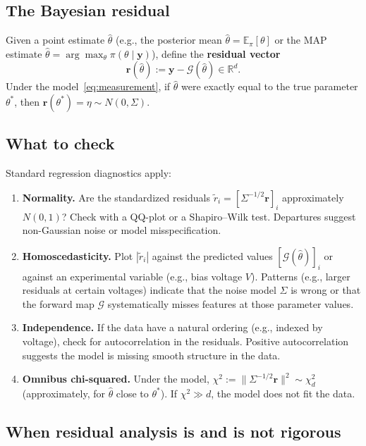 \documentclass[11pt]{article}
\newcommand{\R}{\mathbb{R}}
\newcommand{\cG}{\mathcal{G}}
\newcommand{\E}{\mathbb{E}}
\theoremstyle{plain}
\theoremstyle{remark}
\theoremstyle{definition}
\begin{document}
\subsection{The Bayesian residual}

Given a point estimate $\hat\theta$ (e.g., the posterior mean 
$\hat\theta = \E_\pi[\theta]$ or the MAP estimate 
$\hat\theta = \arg\max_\theta \pi(\theta \mid \mathbf{y})$), define the 
\textbf{residual vector}
\begin{equation}\label{eq:residual}
\mathbf{r}(\hat\theta) := \mathbf{y} - \cG(\hat\theta) \in \R^d.
\end{equation}
Under the model~\eqref{eq:measurement}, if $\hat\theta$ were exactly equal 
to the true parameter $\theta^*$, then 
$\mathbf{r}(\theta^*) = \eta \sim N(0, \Sigma)$.

\subsection{What to check}

Standard regression diagnostics apply:
\begin{enumerate}[label=(\alph*)]
\item \textbf{Normality.} Are the standardized residuals 
  $\tilde{r}_i = [\Sigma^{-1/2}\mathbf{r}]_i$ approximately $N(0, 1)$? 
  Check with a QQ-plot or a Shapiro--Wilk test. Departures suggest 
  non-Gaussian noise or model misspecification.
\item \textbf{Homoscedasticity.} Plot $|\tilde{r}_i|$ against the 
  predicted values $[\cG(\hat\theta)]_i$ or against an experimental 
  variable (e.g., bias voltage $V$). Patterns (e.g., larger residuals 
  at certain voltages) indicate that the noise model $\Sigma$ is wrong 
  or that the forward map $\cG$ systematically misses features at those 
  parameter values.
\item \textbf{Independence.} If the data have a natural ordering (e.g., 
  indexed by voltage), check for autocorrelation in the residuals. 
  Positive autocorrelation suggests the model is missing smooth structure 
  in the data.
\item \textbf{Omnibus chi-squared.} Under the model, 
  $\chi^2 := \|\Sigma^{-1/2}\mathbf{r}\|^2 \sim \chi^2_d$ 
  (approximately, for $\hat\theta$ close to $\theta^*$). If 
  $\chi^2 \gg d$, the model does not fit the data.
\end{enumerate}

\subsection{When residual analysis is and is not rigorous}
\end{document}
